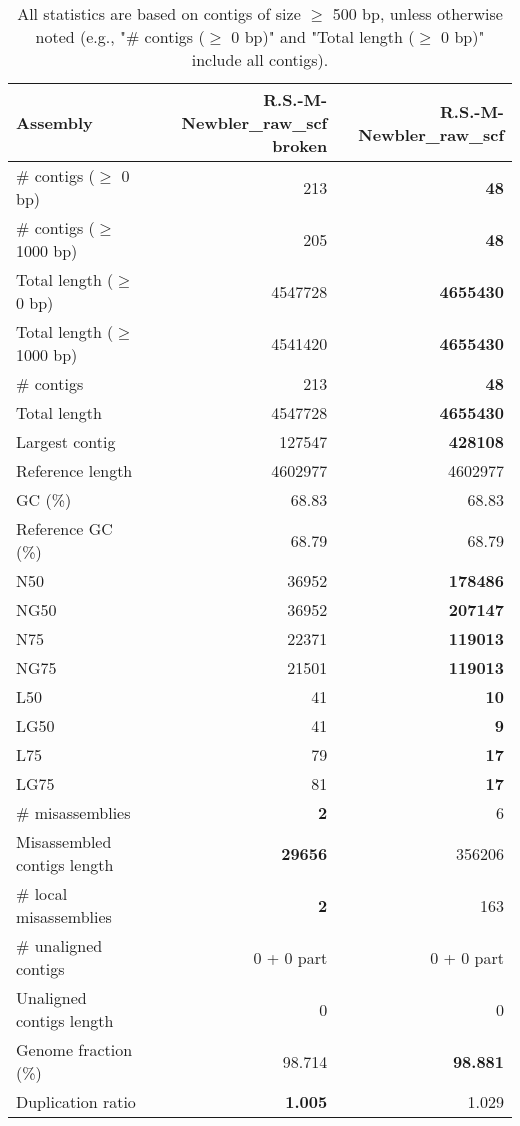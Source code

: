 \documentclass[12pt,a4paper]{article}
\begin{document}
\begin{table}[ht]
\begin{center}
\caption{All statistics are based on contigs of size $\geq$ 500 bp, unless otherwise noted (e.g., "\# contigs ($\geq$ 0 bp)" and "Total length ($\geq$ 0 bp)" include all contigs).}
\begin{tabular}{|l*{2}{|r}|}
\hline
Assembly & R.S.-M-Newbler\_raw\_scf broken & R.S.-M-Newbler\_raw\_scf \\ \hline
\# contigs ($\geq$ 0 bp) & 213 & {\bf 48} \\ \hline
\# contigs ($\geq$ 1000 bp) & 205 & {\bf 48} \\ \hline
Total length ($\geq$ 0 bp) & 4547728 & {\bf 4655430} \\ \hline
Total length ($\geq$ 1000 bp) & 4541420 & {\bf 4655430} \\ \hline
\# contigs & 213 & {\bf 48} \\ \hline
Total length & 4547728 & {\bf 4655430} \\ \hline
Largest contig & 127547 & {\bf 428108} \\ \hline
Reference length & 4602977 & 4602977 \\ \hline
GC (\%) & 68.83 & 68.83 \\ \hline
Reference GC (\%) & 68.79 & 68.79 \\ \hline
N50 & 36952 & {\bf 178486} \\ \hline
NG50 & 36952 & {\bf 207147} \\ \hline
N75 & 22371 & {\bf 119013} \\ \hline
NG75 & 21501 & {\bf 119013} \\ \hline
L50 & 41 & {\bf 10} \\ \hline
LG50 & 41 & {\bf 9} \\ \hline
L75 & 79 & {\bf 17} \\ \hline
LG75 & 81 & {\bf 17} \\ \hline
\# misassemblies & {\bf 2} & 6 \\ \hline
Misassembled contigs length & {\bf 29656} & 356206 \\ \hline
\# local misassemblies & {\bf 2} & 163 \\ \hline
\# unaligned contigs & 0 + 0 part & 0 + 0 part \\ \hline
Unaligned contigs length & 0 & 0 \\ \hline
Genome fraction (\%) & 98.714 & {\bf 98.881} \\ \hline
Duplication ratio & {\bf 1.005} & 1.029 \\ \hline

\end{tabular}
\end{center}
\end{table}
\end{document}

